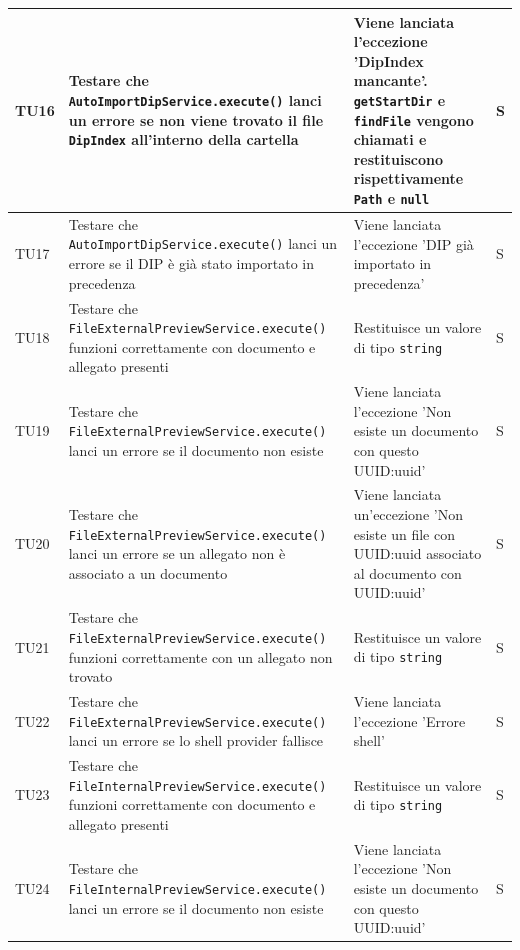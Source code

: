 \documentclass[a4paper,12pt]{article}
\begin{document}
\begin{longtable}{|M{1.2cm}|M{5cm}|M{5cm}|M{1.5cm}|}
            TU16 & Testare che \texttt{AutoImportDipService.execute()} lanci un errore se non viene trovato il file \texttt{DipIndex} all'interno della cartella & Viene lanciata l'eccezione 'DipIndex mancante'. \texttt{getStartDir} e \texttt{findFile} vengono chiamati e restituiscono rispettivamente \texttt{Path} e \texttt{null} & S \\
            \hline

            TU17 & Testare che \texttt{AutoImportDipService.execute()} lanci un errore se il DIP è già stato importato in precedenza & Viene lanciata l'eccezione 'DIP già importato in precedenza' & S \\
            \hline

            TU18 & Testare che \texttt{FileExternalPreviewService.execute()} funzioni correttamente con documento e allegato presenti & Restituisce un valore di tipo \texttt{string} & S \\
            \hline

            TU19 & Testare che \texttt{FileExternalPreviewService.execute()} lanci un errore se il documento non esiste & Viene lanciata l'eccezione 'Non esiste un documento con questo UUID:uuid' & S \\
            \hline

            TU20 & Testare che \texttt{FileExternalPreviewService.execute()} lanci un errore se un allegato non è associato a un documento & Viene lanciata un'eccezione 'Non esiste un file con UUID:uuid associato al documento con UUID:uuid' & S \\
            \hline

            TU21 & Testare che \texttt{FileExternalPreviewService.execute()} funzioni correttamente con un allegato non trovato & Restituisce un valore di tipo \texttt{string} & S \\
            \hline

            TU22 & Testare che \texttt{FileExternalPreviewService.execute()} lanci un errore se lo shell provider fallisce & Viene lanciata l'eccezione 'Errore shell' & S \\
            \hline

            TU23 & Testare che \texttt{FileInternalPreviewService.execute()} funzioni correttamente con documento e allegato presenti & Restituisce un valore di tipo \texttt{string} & S \\
            \hline

            TU24 & Testare che \texttt{FileInternalPreviewService.execute()} lanci un errore se il documento non esiste & Viene lanciata l'eccezione 'Non esiste un documento con questo UUID:uuid' & S \\
            \hline


\end{longtable}
\end{document}
